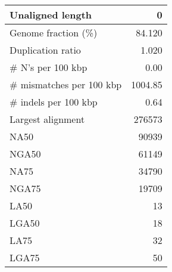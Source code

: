 \documentclass[12pt,a4paper]{article}
\begin{document}
\begin{table}[ht]
\begin{center}
\begin{tabular}{|l*{1}{|r}|}
Unaligned length & 0 \\ \hline
Genome fraction (\%) & 84.120 \\ \hline
Duplication ratio & 1.020 \\ \hline
\# N's per 100 kbp & 0.00 \\ \hline
\# mismatches per 100 kbp & 1004.85 \\ \hline
\# indels per 100 kbp & 0.64 \\ \hline
Largest alignment & 276573 \\ \hline
NA50 & 90939 \\ \hline
NGA50 & 61149 \\ \hline
NA75 & 34790 \\ \hline
NGA75 & 19709 \\ \hline
LA50 & 13 \\ \hline
LGA50 & 18 \\ \hline
LA75 & 32 \\ \hline
LGA75 & 50 \\ \hline
\end{tabular}
\end{center}
\end{table}
\end{document}
